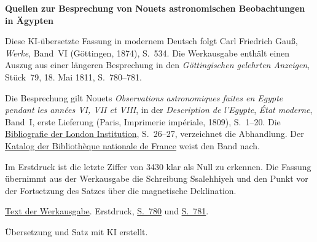 \clearpage\thispagestyle{empty}
\begin{center}\textbf{Quellen zur Besprechung von Nouets astronomischen Beobachtungen in Ägypten}\end{center}
\noindent Diese KI-übersetzte Fassung in modernem Deutsch folgt Carl Friedrich Gauß, \textit{Werke}, Band~VI (Göttingen, 1874), S.~534. Die Werkausgabe enthält einen Auszug aus einer längeren Besprechung in den \textit{Göttingischen gelehrten Anzeigen}, Stück~79, 18. Mai 1811, S.~780--781.
\par\smallskip\noindent Die Besprechung gilt Nouets \textit{Observations astronomiques faites en Egypte pendant les années VI, VII et VIII}, in der \textit{Description de l'Egypte}, \textit{État moderne}, Band~I, erste Lieferung (Paris, Imprimerie impériale, 1809), S.~1--20. Die \href{https://archive.org/details/bibliographicala00thom}{Bibliografie der London Institution}, S.~26--27, verzeichnet die Abhandlung. Der \href{https://catalogue.bnf.fr/ark:/12148/cb35129066r}{Katalog der Bibliothèque nationale de France} weist den Band nach.
\par\smallskip\noindent Im Erstdruck ist die letzte Ziffer von 3430 klar als Null zu erkennen. Die Fassung übernimmt aus der Werkausgabe die Schreibung Ssalehhiyeh und den Punkt vor der Fortsetzung des Satzes über die magnetische Deklination.
\par\smallskip\noindent \href{https://gdz.sub.uni-goettingen.de/id/PPN236007467}{Text der Werkausgabe}. Erstdruck, \href{https://images.p.sub.uni-goettingen.de/iiif/image/gdz:PPN319721507_1811:00000812/full/1650,/0/default.jpg}{S.~780} und \href{https://images.p.sub.uni-goettingen.de/iiif/image/gdz:PPN319721507_1811:00000813/full/1650,/0/default.jpg}{S.~781}.
\par\smallskip\noindent Übersetzung und Satz mit KI erstellt.
\clearpage
